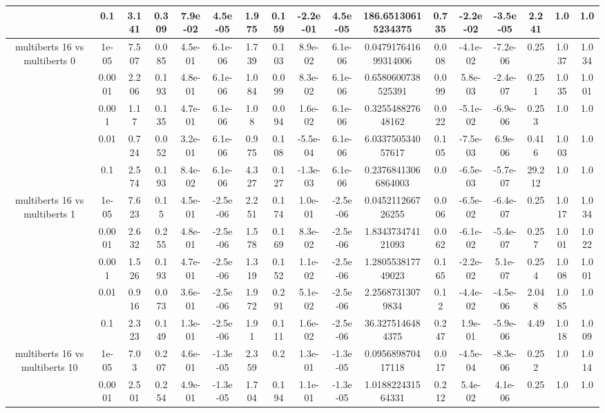 \begin{tabular}{|c|c|c|c|c|c|c|c|c|c|c|c|c|c|c|c|c|}
 & 0.1 & 3.141 & 0.309 & 7.9e-02 & 4.5e-05 & 1.975 & 0.159 & -2.2e-01 & 4.5e-05 & 186.65130615234375 & 0.735 & -2.2e-02 & -3.5e-05 & 2.241 & 1.0 & 1.0 \\
\hline
\multirow{5}{*}{multiberts 16 vs multiberts 0} & 1e-05 & 7.507 & 0.085 & 4.5e-01 & 6.1e-06 & 1.739 & 0.103 & 8.9e-02 & 6.1e-06 & 0.047917641699314006 & 0.008 & -4.1e-02 & -7.2e-06 & 0.25 & 1.037 & 1.034 \\
 & 0.0001 & 2.206 & 0.193 & 4.8e-01 & 6.1e-06 & 1.084 & 0.099 & 8.3e-02 & 6.1e-06 & 0.6580600738525391 & 0.099 & 5.8e-03 & -2.4e-07 & 0.251 & 1.035 & 1.001 \\
 & 0.001 & 1.17 & 0.135 & 4.7e-01 & 6.1e-06 & 1.08 & 0.094 & 1.6e-02 & 6.1e-06 & 0.325548827648162 & 0.022 & -5.1e-02 & -6.9e-06 & 0.253 & 1.0 & 1.0 \\
 & 0.01 & 0.724 & 0.052 & 3.2e-01 & 6.1e-06 & 0.975 & 0.108 & -5.5e-04 & 6.1e-06 & 6.033750534057617 & 0.105 & -7.5e-03 & 6.9e-06 & 0.416 & 1.003 & 1.0 \\
 & 0.1 & 2.574 & 0.193 & 8.4e-02 & 6.1e-06 & 4.327 & 0.127 & -1.3e-03 & 6.1e-06 & 0.23768413066864003 & 0.0 & -6.5e-03 & -5.7e-07 & 29.212 & 1.0 & 1.0 \\
\hline
\multirow{5}{*}{multiberts 16 vs multiberts 1} & 1e-05 & 7.623 & 0.15 & 4.5e-01 & -2.5e-06 & 2.251 & 0.174 & 1.0e-01 & -2.5e-06 & 0.045211266726255 & 0.006 & -6.5e-02 & -6.4e-07 & 0.25 & 1.017 & 1.034 \\
 & 0.0001 & 2.632 & 0.255 & 4.8e-01 & -2.5e-06 & 1.578 & 0.169 & 8.3e-02 & -2.5e-06 & 1.834373474121093 & 0.062 & -6.1e-02 & -5.4e-07 & 0.257 & 1.001 & 1.022 \\
 & 0.001 & 1.526 & 0.193 & 4.7e-01 & -2.5e-06 & 1.319 & 0.152 & 1.1e-02 & -2.5e-06 & 1.280553817749023 & 0.165 & -2.2e-02 & 5.1e-07 & 0.254 & 1.008 & 1.001 \\
 & 0.01 & 0.916 & 0.073 & 3.6e-01 & -2.5e-06 & 1.972 & 0.291 & 5.1e-02 & -2.5e-06 & 2.25687313079834 & 0.12 & -4.4e-02 & -4.5e-06 & 2.048 & 1.085 & 1.0 \\
 & 0.1 & 2.323 & 0.149 & 1.3e-01 & -2.5e-06 & 1.91 & 0.111 & 1.6e-02 & -2.5e-06 & 36.3275146484375 & 0.247 & 1.9e-01 & -5.9e-06 & 4.49 & 1.018 & 1.009 \\
\hline
\multirow{5}{*}{multiberts 16 vs multiberts 10} & 1e-05 & 7.03 & 0.207 & 4.6e-01 & -1.3e-05 & 2.359 & 0.2 & 1.3e-01 & -1.3e-05 & 0.095689870417118 & 0.017 & -4.5e-04 & -8.3e-06 & 0.252 & 1.0 & 1.014 \\
 & 0.0001 & 2.501 & 0.254 & 4.9e-01 & -1.3e-05 & 1.704 & 0.194 & 1.1e-01 & -1.3e-05 & 1.018822431564331 & 0.212 & 5.4e-02 & 4.1e-06 & 0.25 & 1.0 & 1.0 \\

\end{tabular}
